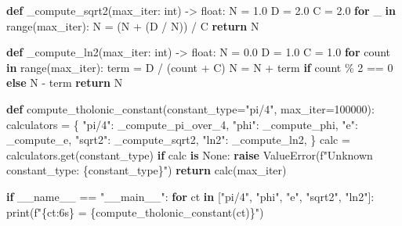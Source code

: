 \documentclass[
  11pt,
  letterpaper,
]{article}
\newenvironment{Shaded}{}{}
\newcommand{\BuiltInTok}[1]{\textcolor[rgb]{0.00,0.50,0.00}{#1}}
\newcommand{\ControlFlowTok}[1]{\textcolor[rgb]{0.00,0.44,0.13}{\textbf{#1}}}
\newcommand{\DecValTok}[1]{\textcolor[rgb]{0.25,0.63,0.44}{#1}}
\newcommand{\FloatTok}[1]{\textcolor[rgb]{0.25,0.63,0.44}{#1}}
\newcommand{\KeywordTok}[1]{\textcolor[rgb]{0.00,0.44,0.13}{\textbf{#1}}}
\newcommand{\NormalTok}[1]{#1}
\newcommand{\OperatorTok}[1]{\textcolor[rgb]{0.40,0.40,0.40}{#1}}
\newcommand{\PreprocessorTok}[1]{\textcolor[rgb]{0.74,0.48,0.00}{#1}}
\newcommand{\SpecialCharTok}[1]{\textcolor[rgb]{0.25,0.44,0.63}{#1}}
\newcommand{\SpecialStringTok}[1]{\textcolor[rgb]{0.73,0.40,0.53}{#1}}
\newcommand{\StringTok}[1]{\textcolor[rgb]{0.25,0.44,0.63}{#1}}
\newcommand{\VariableTok}[1]{\textcolor[rgb]{0.10,0.09,0.49}{#1}}
\begin{document}
\begin{Shaded}
\begin{Highlighting}[]
\KeywordTok{def}\NormalTok{ \_compute\_sqrt2(max\_iter: }\BuiltInTok{int}\NormalTok{) }\OperatorTok{{-}\textgreater{}} \BuiltInTok{float}\NormalTok{:}
\NormalTok{    N }\OperatorTok{=} \FloatTok{1.0}
\NormalTok{    D }\OperatorTok{=} \FloatTok{2.0}
\NormalTok{    C }\OperatorTok{=} \FloatTok{2.0}
    \ControlFlowTok{for}\NormalTok{ \_ }\KeywordTok{in} \BuiltInTok{range}\NormalTok{(max\_iter):}
\NormalTok{        N }\OperatorTok{=}\NormalTok{ (N }\OperatorTok{+}\NormalTok{ (D }\OperatorTok{/}\NormalTok{ N)) }\OperatorTok{/}\NormalTok{ C}
    \ControlFlowTok{return}\NormalTok{ N}


\KeywordTok{def}\NormalTok{ \_compute\_ln2(max\_iter: }\BuiltInTok{int}\NormalTok{) }\OperatorTok{{-}\textgreater{}} \BuiltInTok{float}\NormalTok{:}
\NormalTok{    N }\OperatorTok{=} \FloatTok{0.0}
\NormalTok{    D }\OperatorTok{=} \FloatTok{1.0}
\NormalTok{    C }\OperatorTok{=} \FloatTok{1.0}
    \ControlFlowTok{for}\NormalTok{ count }\KeywordTok{in} \BuiltInTok{range}\NormalTok{(max\_iter):}
\NormalTok{        term }\OperatorTok{=}\NormalTok{ D }\OperatorTok{/}\NormalTok{ (count }\OperatorTok{+}\NormalTok{ C)}
\NormalTok{        N }\OperatorTok{=}\NormalTok{ N }\OperatorTok{+}\NormalTok{ term }\ControlFlowTok{if}\NormalTok{ count }\OperatorTok{\%} \DecValTok{2} \OperatorTok{==} \DecValTok{0} \ControlFlowTok{else}\NormalTok{ N }\OperatorTok{{-}}\NormalTok{ term}
    \ControlFlowTok{return}\NormalTok{ N}


\KeywordTok{def}\NormalTok{ compute\_tholonic\_constant(constant\_type}\OperatorTok{=}\StringTok{"pi/4"}\NormalTok{, max\_iter}\OperatorTok{=}\DecValTok{100000}\NormalTok{):}
\NormalTok{    calculators }\OperatorTok{=}\NormalTok{ \{}
        \StringTok{"pi/4"}\NormalTok{:  \_compute\_pi\_over\_4,}
        \StringTok{"phi"}\NormalTok{:   \_compute\_phi,}
        \StringTok{"e"}\NormalTok{:     \_compute\_e,}
        \StringTok{"sqrt2"}\NormalTok{: \_compute\_sqrt2,}
        \StringTok{"ln2"}\NormalTok{:   \_compute\_ln2,}
\NormalTok{    \}}
\NormalTok{    calc }\OperatorTok{=}\NormalTok{ calculators.get(constant\_type)}
    \ControlFlowTok{if}\NormalTok{ calc }\KeywordTok{is} \VariableTok{None}\NormalTok{:}
        \ControlFlowTok{raise} \PreprocessorTok{ValueError}\NormalTok{(}\SpecialStringTok{f"Unknown constant\_type: }\SpecialCharTok{\{}\NormalTok{constant\_type}\SpecialCharTok{\}}\SpecialStringTok{"}\NormalTok{)}
    \ControlFlowTok{return}\NormalTok{ calc(max\_iter)}


\ControlFlowTok{if} \VariableTok{\_\_name\_\_} \OperatorTok{==} \StringTok{"\_\_main\_\_"}\NormalTok{:}
    \ControlFlowTok{for}\NormalTok{ ct }\KeywordTok{in}\NormalTok{ [}\StringTok{"pi/4"}\NormalTok{, }\StringTok{"phi"}\NormalTok{, }\StringTok{"e"}\NormalTok{, }\StringTok{"sqrt2"}\NormalTok{, }\StringTok{"ln2"}\NormalTok{]:}
        \BuiltInTok{print}\NormalTok{(}\SpecialStringTok{f"}\SpecialCharTok{\{}\NormalTok{ct}\SpecialCharTok{:6s\}}\SpecialStringTok{ = }\SpecialCharTok{\{}\NormalTok{compute\_tholonic\_constant(ct)}\SpecialCharTok{\}}\SpecialStringTok{"}\NormalTok{)}
\end{Highlighting}
\end{Shaded}
\end{document}
